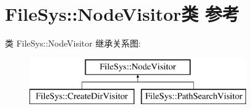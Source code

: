 \hypertarget{class_file_sys_1_1_node_visitor}{\section{File\-Sys\-:\-:Node\-Visitor类 参考}
\label{class_file_sys_1_1_node_visitor}
}
类 File\-Sys\-:\-:Node\-Visitor 继承关系图\-:\begin{figure}[H]
\begin{center}
\leavevmode
\includegraphics[height=2.000000cm]{class_file_sys_1_1_node_visitor}
\end{center}
\end{figure}
